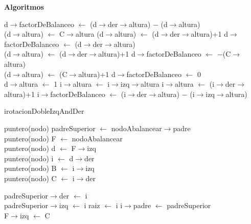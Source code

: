\documentclass[a4paper,10pt]{article}
\newenvironment{Algoritmos}{%
  \vspace*{2ex}%
  \noindent\textbf{\Large Algoritmos}%
  \vspace*{2ex}%
}{}
\begin{document}
\begin{Algoritmos}
\newpage
\begin{algorithm}[H]
{
{
{d$\rightarrow$factorDeBalanceo $\leftarrow$  (d$\rightarrow$der$\rightarrow$altura) $-$ (d$\rightarrow$altura) \\
{
{(d$\rightarrow$altura) $\leftarrow$ C$\rightarrow$altura}
{(d$\rightarrow$altura) $\leftarrow$ (d$\rightarrow$der$\rightarrow$altura)+1}
}
}
{d$\rightarrow$factorDeBalanceo $\leftarrow$ (d$\rightarrow$der$\rightarrow$altura) \\
(d$\rightarrow$altura) $\leftarrow$ (d$\rightarrow$der$\rightarrow$altura)+1
}
}
{
{d$\rightarrow$factorDeBalanceo $\leftarrow$ $-$(C$\rightarrow$altura)\\
(d$\rightarrow$altura) $\leftarrow$ (C$\rightarrow$altura)+1}
{d$\rightarrow$factorDeBalanceo $\leftarrow$ 0\\
 d$\rightarrow$altura $\leftarrow$ 1}
}
{
{i$\rightarrow$altura $\leftarrow$ i$\rightarrow$izq$\rightarrow$altura}
{i$\rightarrow$altura $\leftarrow$ (i$\rightarrow$der$\rightarrow$altura)+1}
}
{i$\rightarrow$factorDeBalanceo $\leftarrow$ (i$\rightarrow$der$\rightarrow$altura) $-$ (i$\rightarrow$izq$\rightarrow$altura) \\}
}
\caption{irotacionDobleIzqAndDer}
\end{algorithm}


\newline
\begin{algorithm}[H]
{puntero(nodo) padreSuperior $\leftarrow$ nodoAbalancear$\rightarrow$padre\\}
{puntero(nodo) F $\leftarrow$ nodoAbalancear\\}
{puntero(nodo) d $\leftarrow$ F$\rightarrow$izq\\}
{puntero(nodo) i $\leftarrow$ d$\rightarrow$der\\}
{puntero(nodo) B $\leftarrow$ i$\rightarrow$izq\\}
{puntero(nodo) C $\leftarrow$ i$\rightarrow$der\\}

{
{
{padreSuperior$\rightarrow$der $\leftarrow$ i \\
}
{padreSuperior$\rightarrow$izq $\leftarrow$ i}
}
{raiz $\leftarrow$ i}
}
{i$\rightarrow$padre $\leftarrow$ padreSuperior\\}
{F$\rightarrow$izq $\leftarrow$ C\\}


\end{algorithm}
\end{Algoritmos}
\end{document}
